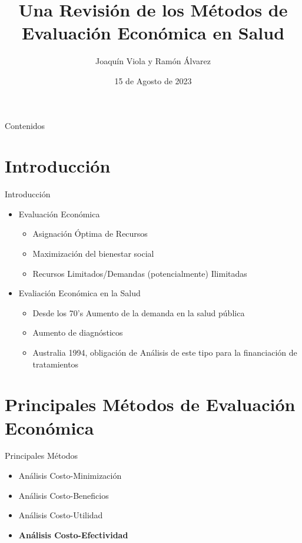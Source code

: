 \documentclass[xcolor=dvipsnames]{beamer}
\title[Economía de la Salud]{Una Revisión de los Métodos de Evaluación Económica en Salud}
\date{15 de Agosto de 2023}
\author[J. Viola y R. Álvarez]
{Joaquín Viola y Ramón Álvarez}
\institute[IESTA]{\\IESTA - FCEA - UdelaR}
\begin{document}
	
	\begin{frame}
		\titlepage
	\end{frame}

    \begin{frame}{Contenidos}
        \tableofcontents 
    \end{frame}


     \section{Introducción}


    \begin{frame}{Introducción}
   
    
    \begin{itemize}
        \item Evaluación Económica
        \begin{itemize}
            \item Asignación Óptima de Recursos
            \item Maximización del bienestar social
            \item Recursos Limitados/Demandas (potencialmente) Ilimitadas
        \end{itemize}
        \item Evaliación Económica en la Salud
        \begin{itemize}
            \item Desde los 70's Aumento de la demanda en la salud pública
            \item Aumento de diagnósticos
            \item Australia 1994, obligación de Análisis de este tipo para la financiación de tratamientos
        \end{itemize}
    \end{itemize}
    
    \end{frame}

    \section{Principales Métodos de Evaluación Económica}

    \begin{frame}{Principales Métodos}

    \begin{itemize}
        \item Análisis Costo-Minimización
        \item Análisis Costo-Beneficios
        \item Análisis Costo-Utilidad
        \item \textbf{Análisis Costo-Efectividad}
    \end{itemize}
    
    \end{frame}
\end{document}
